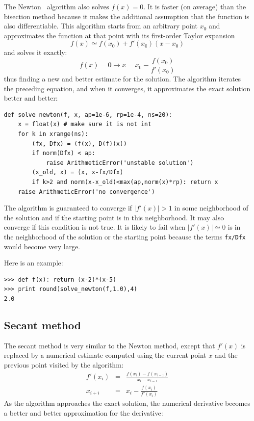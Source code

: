 \documentclass[justified,sixbynine]{tufte-book}
\def\ft{\small\tt}
\theoremstyle{plain}%
\theoremstyle{definition}
\theoremstyle{remark}
\begin{document}
\begin{fullwidth}
The Newton~\cite{newton} algorithm also solves $f(x)=0$. It is faster (on average) than the bisection method because it makes the additional assumption that the function is also differentiable. This algorithm starts from an arbitrary point $x_0$ and approximates the function at that point with its first-order Taylor expansion
\begin{equation}
f(x) \simeq f(x_0) + f'(x_0)(x-x_0)
\end{equation}
and solves it exactly:
\begin{equation}
f(x) = 0 \rightarrow x = x_0 - \frac{f(x_0)}{f'(x_0)}
\end{equation}
thus finding a new and better estimate for the solution. The algorithm iterates the preceding equation, and when it converges, it approximates the exact solution better and better:

\begin{lstlisting}[caption={in file: {\ft nlib.py}}]
def solve_newton(f, x, ap=1e-6, rp=1e-4, ns=20):
    x = float(x) # make sure it is not int
    for k in xrange(ns):
        (fx, Dfx) = (f(x), D(f)(x))
        if norm(Dfx) < ap:
            raise ArithmeticError('unstable solution')
        (x_old, x) = (x, x-fx/Dfx)
        if k>2 and norm(x-x_old)<max(ap,norm(x)*rp): return x
    raise ArithmeticError('no convergence')
\end{lstlisting}

The algorithm is guaranteed to converge if $|f'(x)|>1$ in some neighborhood of the solution and if the starting point is in this neighborhood. It may also converge if this condition is not true. It is likely to fail when $|f'(x)|\simeq 0$ is in the neighborhood of the solution or the starting point because the terms {\ft fx/Dfx} would become very large.

Here is an example:

\begin{lstlisting}[caption={in file: {\ft nlib.py}}]
>>> def f(x): return (x-2)*(x-5)
>>> print round(solve_newton(f,1.0),4)
2.0
\end{lstlisting}

\goodbreak\subsection{Secant method}


The secant method is very similar to the Newton method, except that $f'(x)$ is replaced by a numerical estimate computed using the current point $x$ and the previous point visited by the algorithm:
\begin{eqnarray}
f'(x_i) &=& \frac{f(x_i)-f(x_{i-1})}{x_i-x_{i-1}} \\
x_{i+i} &=& x_i - \frac{f(x_i)}{f'(x_i)}
\end{eqnarray}
As the algorithm approaches the exact solution, the numerical derivative becomes a better and better approximation for the derivative:


\end{fullwidth}
\end{document}
